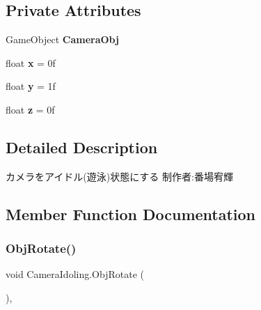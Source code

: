 \subsection*{Private Attributes}
\begin{DoxyCompactItemize}
\item 
\mbox{\label{class_camera_idoling_a018c2ebd3562bba31ffbec9c9ae2cc26}} 
Game\+Object {\bfseries Camera\+Obj}
\item 
\mbox{\label{class_camera_idoling_acebc306125aad1833ff6af79f133f4d1}} 
float {\bfseries x} = 0f
\item 
\mbox{\label{class_camera_idoling_a3b72c52e9fc1c1218258eda6cddb5c67}} 
float {\bfseries y} = 1f
\item 
\mbox{\label{class_camera_idoling_a65398f84aedeacd3fc8785b1f3463c51}} 
float {\bfseries z} = 0f
\end{DoxyCompactItemize}


\subsection{Detailed Description}
カメラをアイドル(遊泳)状態にする 制作者\+:番場宥輝 



\subsection{Member Function Documentation}
\mbox{\label{class_camera_idoling_aea64e8d32b33d224b377365c89ebd7f8}} 
\subsubsection{\texorpdfstring{Obj\+Rotate()}{ObjRotate()}}
{\footnotesize\ttfamily void Camera\+Idoling.\+Obj\+Rotate (\begin{DoxyParamCaption}{ }\end{DoxyParamCaption})\hspace{0.3cm}{\ttfamily [inline]}, {\ttfamily [private]}}



